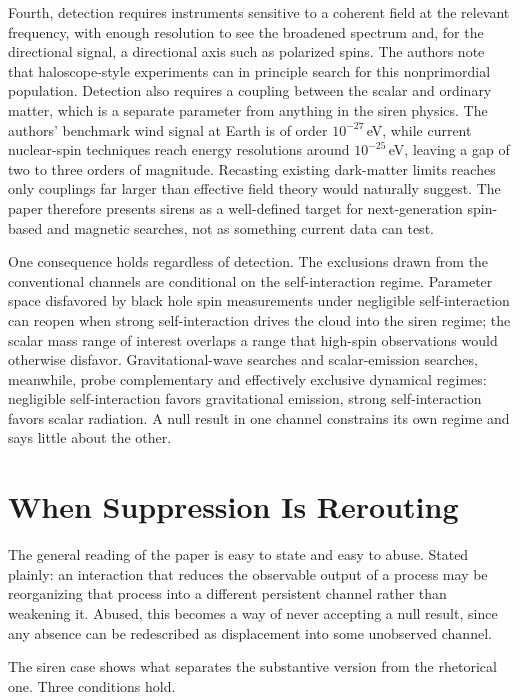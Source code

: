 \documentclass[11pt]{article}
\begin{document}
Fourth, detection requires instruments sensitive to a coherent field at the relevant frequency, with enough resolution to see the broadened spectrum and, for the directional signal, a directional axis such as polarized spins. The authors note that haloscope-style experiments can in principle search for this nonprimordial population. Detection also requires a coupling between the scalar and ordinary matter, which is a separate parameter from anything in the siren physics. The authors' benchmark wind signal at Earth is of order $10^{-27}$\,eV, while current nuclear-spin techniques reach energy resolutions around $10^{-25}$\,eV, leaving a gap of two to three orders of magnitude. Recasting existing dark-matter limits reaches only couplings far larger than effective field theory would naturally suggest. The paper therefore presents sirens as a well-defined target for next-generation spin-based and magnetic searches, not as something current data can test.

One consequence holds regardless of detection. The exclusions drawn from the conventional channels are conditional on the self-interaction regime. Parameter space disfavored by black hole spin measurements under negligible self-interaction can reopen when strong self-interaction drives the cloud into the siren regime; the scalar mass range of interest overlaps a range that high-spin observations would otherwise disfavor. Gravitational-wave searches and scalar-emission searches, meanwhile, probe complementary and effectively exclusive dynamical regimes: negligible self-interaction favors gravitational emission, strong self-interaction favors scalar radiation. A null result in one channel constrains its own regime and says little about the other.

\section{When Suppression Is Rerouting}

The general reading of the paper is easy to state and easy to abuse. Stated plainly: an interaction that reduces the observable output of a process may be reorganizing that process into a different persistent channel rather than weakening it. Abused, this becomes a way of never accepting a null result, since any absence can be redescribed as displacement into some unobserved channel.

The siren case shows what separates the substantive version from the rhetorical one. Three conditions hold.
\end{document}
